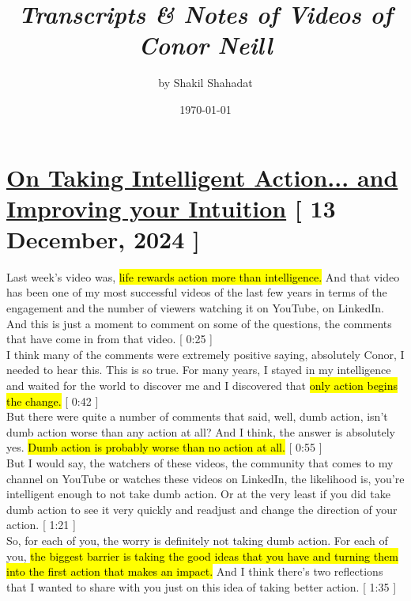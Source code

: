 \documentclass[a4paper,12pt]{article}
\begin{document}
\title{ \textit{Transcripts \& Notes of Videos of Conor Neill}  }
	\author{ by Shakil Shahadat }
	\date{ \today }
\maketitle

\thispagestyle{empty}

\newpage




\section{ \href{https://www.youtube.com/watch?v=5dC5g7wgxOA}{On Taking Intelligent Action... and Improving your Intuition} [ 13 December, 2024 ] }


Last week's video was, \hl{life rewards action more than intelligence.} And that video has been one of my most successful videos of the last few years in terms of the engagement and the number of viewers watching it on YouTube, on LinkedIn. And this is just a moment to comment on some of the questions, the comments that have come in from that video. [ 0:25 ] \\

I think many of the comments were extremely positive saying, absolutely Conor, I needed to hear this. This is so true. For many years, I stayed in my intelligence and waited for the world to discover me and I discovered that \hl{only action begins the change.} [ 0:42 ] \\
 
But there were quite a number of comments that said, well, dumb action, isn't dumb action worse than any action at all? And I think, the answer is absolutely yes. \hl{Dumb action is probably worse than no action at all.} [ 0:55 ] \\

But I would say, the watchers of these videos, the community that comes to my channel on YouTube or watches these videos on LinkedIn, the likelihood is, you're intelligent enough to not take dumb action. Or at the very least if you did take dumb action to see it very quickly and readjust and change the direction of your action. [ 1:21 ] \\

So, for each of you, the worry is definitely not taking dumb action. For each of you, \hl{the biggest barrier is taking the good ideas that you have and turning them into the first action that makes an impact.} And I think there's two reflections that I wanted to share with you just on this idea of taking better action. [ 1:35 ] \\
\end{document}
